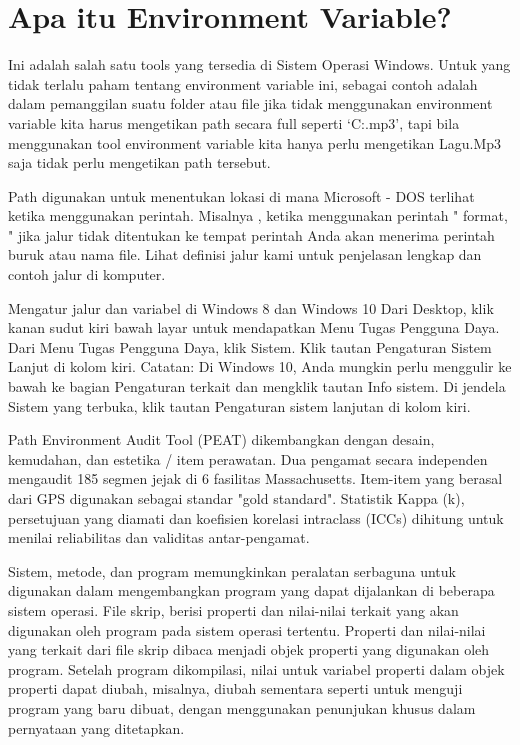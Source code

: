 
\section {Apa itu Environment Variable?}

Ini adalah salah satu tools yang tersedia di Sistem Operasi Windows. Untuk yang tidak terlalu paham tentang environment variable ini, sebagai contoh adalah dalam pemanggilan suatu folder atau file jika tidak menggunakan environment variable kita harus mengetikan path secara full seperti `C:\Music\Lagu.mp3', tapi bila menggunakan tool environment variable kita hanya perlu mengetikan Lagu.Mp3 saja tidak perlu mengetikan path tersebut.

Path digunakan untuk menentukan lokasi di mana Microsoft - DOS terlihat ketika menggunakan perintah. Misalnya , ketika menggunakan perintah " format, " jika jalur tidak ditentukan ke tempat perintah Anda akan menerima perintah buruk atau nama file.  Lihat definisi jalur kami untuk penjelasan lengkap dan contoh jalur di komputer.

Mengatur jalur dan variabel di Windows 8 dan Windows 10
Dari Desktop, klik kanan sudut kiri bawah layar untuk mendapatkan Menu Tugas Pengguna Daya.
Dari Menu Tugas Pengguna Daya, klik Sistem.
Klik tautan Pengaturan Sistem Lanjut di kolom kiri.
Catatan: Di Windows 10, Anda mungkin perlu menggulir ke bawah ke bagian Pengaturan terkait dan mengklik tautan Info sistem. Di jendela Sistem yang terbuka, klik tautan Pengaturan sistem lanjutan di kolom kiri.

Path Environment Audit Tool (PEAT) dikembangkan dengan desain, kemudahan, dan estetika / item perawatan. Dua pengamat secara independen mengaudit 185 segmen jejak di 6 fasilitas Massachusetts. Item-item yang berasal dari GPS digunakan sebagai standar "gold standard". Statistik Kappa (k), persetujuan yang diamati dan koefisien korelasi intraclass (ICCs) dihitung untuk menilai reliabilitas dan validitas antar-pengamat.

Sistem, metode, dan program memungkinkan peralatan serbaguna untuk digunakan dalam mengembangkan program yang dapat dijalankan di beberapa sistem operasi. File skrip, berisi properti dan nilai-nilai terkait yang akan digunakan oleh program pada sistem operasi tertentu. Properti dan nilai-nilai yang terkait dari file skrip dibaca menjadi objek properti yang digunakan oleh program. Setelah program dikompilasi, nilai untuk variabel properti dalam objek properti dapat diubah, misalnya, diubah sementara seperti untuk menguji program yang baru dibuat, dengan menggunakan penunjukan khusus dalam pernyataan yang ditetapkan. \cite{curtis2003overriding}

